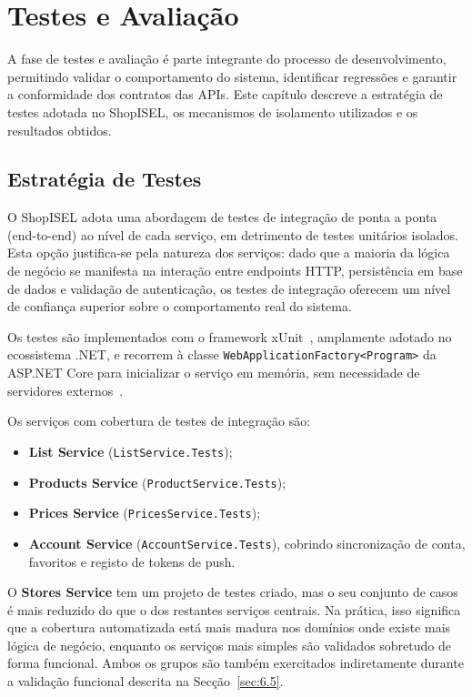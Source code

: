 
\chapter{Testes e Avaliação}
\label{chap:6}

A fase de testes e avaliação é parte integrante do processo de desenvolvimento, permitindo validar o comportamento do sistema, identificar regressões e garantir a conformidade dos contratos das APIs. Este capítulo descreve a estratégia de testes adotada no ShopISEL, os mecanismos de isolamento utilizados e os resultados obtidos.

\section{Estratégia de Testes}
\label{sec:6.1}

O ShopISEL adota uma abordagem de testes de integração de ponta a ponta (end-to-end) ao nível de cada serviço, em detrimento de testes unitários isolados. Esta opção justifica-se pela natureza dos serviços: dado que a maioria da lógica de negócio se manifesta na interação entre endpoints HTTP, persistência em base de dados e validação de autenticação, os testes de integração oferecem um nível de confiança superior sobre o comportamento real do sistema.

Os testes são implementados com o framework xUnit~\cite{xunit-docs}, amplamente adotado no ecossistema .NET, e recorrem à classe \texttt{WebApplicationFactory<Program>} da ASP.NET Core para inicializar o serviço em memória, sem necessidade de servidores externos~\cite{aspnetcore-testing}.

Os serviços com cobertura de testes de integração são:
\begin{itemize}
    \item \textbf{List Service} (\texttt{ListService.Tests});
    \item \textbf{Products Service} (\texttt{ProductService.Tests});
    \item \textbf{Prices Service} (\texttt{PricesService.Tests});
    \item \textbf{Account Service} (\texttt{AccountService.Tests}), cobrindo sincronização de conta, favoritos e registo de tokens de push.
\end{itemize}

O \textbf{Stores Service} tem um projeto de testes criado, mas o seu conjunto de casos é mais reduzido do que o dos restantes serviços centrais. Na prática, isso significa que a cobertura automatizada está mais madura nos domínios onde existe mais lógica de negócio, enquanto os serviços mais simples são validados sobretudo de forma funcional. Ambos os grupos são também exercitados indiretamente durante a validação funcional descrita na Secção~\ref{sec:6.5}.

